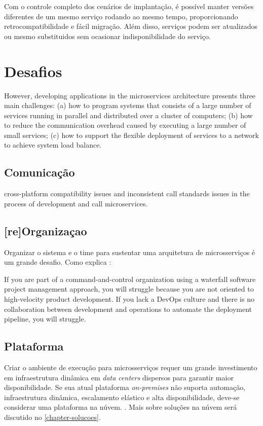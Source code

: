 Com o controle completo dos cenários de implantação, é possível manter versões diferentes de um mesmo serviço rodando ao mesmo tempo, proporcionando retrocompatibilidade e fácil migração. Além disso, serviços podem ser atualizados ou mesmo substituidos sem ocasionar indisponibilidade do serviço. \cite{Familiar2015}


\section{Desafios}

However, developing applications in the microservices architecture presents three main challenges: (a) how to program systems that consists of a large number of services running in parallel and distributed over a cluster of computers; (b) how to reduce the communication overhead caused by executing a large number of small services; (c) how to support the flexible deployment of services to a network to achieve system load balance. \cite{CAOPLE}

\subsection{Comunicação}

cross-platform compatibility issues and inconsistent call standards issues in the process of development and call microservices. \cite{ZUO2020102878}

\subsection{[re]Organizaçao}

Organizar o sistema e o time para sustentar uma arquitetura de microsserviços é um grande desafio. Como explica : 
\begin{citacao}
    If you are part of a command-and-control organization using a waterfall software project management approach, you will struggle because you are not oriented to high-velocity product development. If you lack a DevOps culture and there is no collaboration between development and operations to automate the deployment pipeline, you will struggle. \cite{Familiar2015}
\end{citacao}

\subsection{Plataforma}
Criar o ambiente de execução para microsserviços requer um grande investimento em infraestrutura dinâmica em \emph{data centers} dispersos para garantir maior disponibilidade. Se sua atual plataforma \emph{on-premises} não suporta automação, infraestrutura dinâmica, escalamento elástico e alta disponibilidade, deve-se considerar uma plataforma na núvem. \cite{Familiar2015}. Mais sobre soluções na núvem será discutido no \autoref{chapter-solucoes}.

